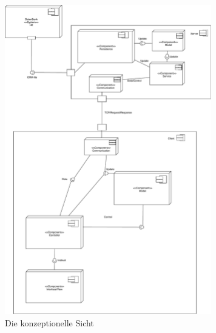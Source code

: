 \documentclass[fontsize=12pt,paper=a4,twoside]{scrartcl}
\begin{document}
\begin{figure}[H]
\begin{center}
  \includegraphics[width=340px]{UML/KonzeptionelleSicht.pdf}
  \caption{Die konzeptionelle Sicht}
  \label{fig:boat1}
\end{center}
\end{figure}


\end{document}
